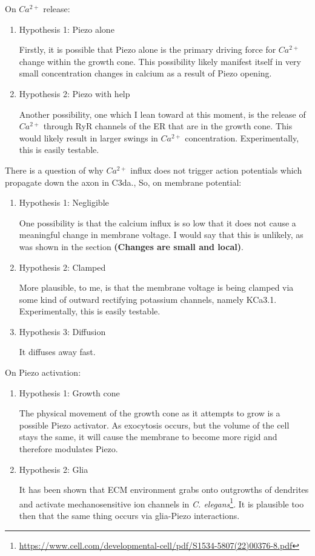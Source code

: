 \documentclass[12pt]{amsart}
\begin{document}
On $Ca^{2+}$ release: 
\begin{enumerate}
    \item Hypothesis 1: Piezo alone

    Firstly, it is possible that Piezo alone is the primary driving force for $Ca^{2+}$ change within the growth cone. This possibility likely manifest itself in very small concentration changes in calcium as a result of Piezo opening. 
    
    \item Hypothesis 2: Piezo with help

    Another possibility, one which I lean toward at this moment, is the release of $Ca^{2+}$ through RyR channels of the ER that are in the growth cone. This would likely result in larger swings in $Ca^{2+}$ concentration. Experimentally, this is easily testable. 
\end{enumerate}

\bigskip

 There is a question of why $Ca^{2+}$ influx does not trigger action potentials which propagate down the axon in C3da., So, on membrane potential: 
\begin{enumerate}
    \item Hypothesis 1: Negligible

   One possibility is that the calcium influx is so low that it does not cause a meaningful change in membrane voltage. I would say that this is unlikely, as was shown in the section \textbf{(Changes are small and local)}. 
    
    \item Hypothesis 2: Clamped

    More plausible, to me, is that the membrane voltage is being clamped via some kind of outward rectifying potassium channels, namely KCa3.1. Experimentally, this is easily testable. 

    \item Hypothesis 3: Diffusion

    It diffuses away fast.
\end{enumerate}

\bigskip

On Piezo activation: 
\begin{enumerate}
    \item Hypothesis 1: Growth cone

   The physical movement of the growth cone as it attempts to grow is a possible Piezo activator. As exocytosis occurs, but the volume of the cell stays the same, it will cause the membrane to become more rigid and therefore modulates Piezo.  
    
    \item Hypothesis 2: Glia

    It has been shown that ECM environment grabs onto outgrowths of dendrites and activate mechanosensitive ion channels in \textit{C. elegans}\footnote{\url{https://www.cell.com/developmental-cell/pdf/S1534-5807(22)00376-8.pdf}}. It is plausible too then that the same thing occurs via glia-Piezo interactions. 
\end{enumerate}
\end{document}
